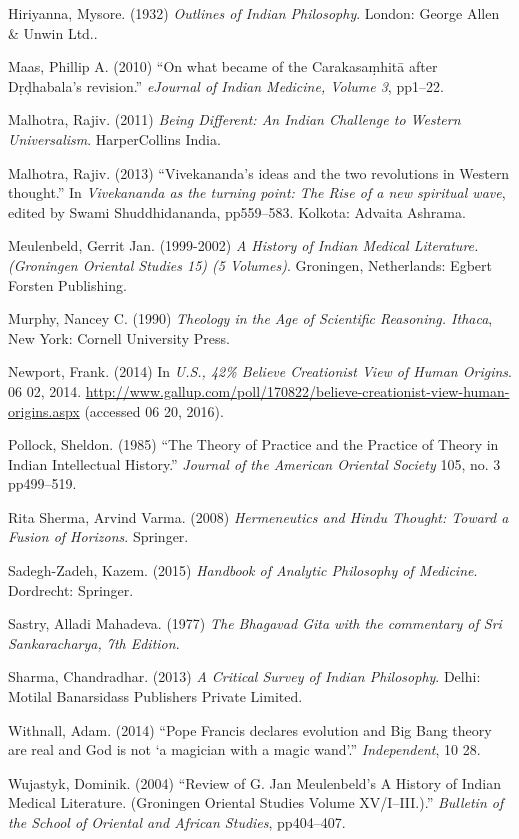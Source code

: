 \begin{thebibliography}{99}
Hiriyanna, Mysore. (1932) {\sl Outlines of Indian Philosophy}. London: George Allen \& Unwin Ltd..

Maas, Phillip A. (2010) ``On what became of the Carakasaṃhitā after Dṛḍhabala's revision.'' {\sl eJournal of Indian Medicine, Volume 3}, pp1--22.

Malhotra, Rajiv. (2011) {\sl Being Different: An Indian Challenge to Western Universalism}. HarperCollins India.

Malhotra, Rajiv. (2013) ``Vivekananda's ideas and the two revolutions in Western thought.'' In {\sl Vivekananda as the turning point: The Rise of a new spiritual wave}, edited by Swami Shuddhidananda, pp559--583. Kolkota: Advaita Ashrama.

Meulenbeld, Gerrit Jan. (1999-2002) {\sl A History of Indian Medical Literature. (Groningen Oriental Studies 15) (5 Volumes)}. Groningen, Netherlands: Egbert Forsten Publishing.

Murphy, Nancey C. (1990) {\sl Theology in the Age of Scientific Reasoning. Ithaca}, New York: Cornell University Press.

Newport, Frank. (2014) In {\sl U.S., 42\% Believe Creationist View of Human Origins}. 06 02, 2014. \url{http://www.gallup.com/poll/170822/believe-creationist-view-human-origins.aspx} (accessed 06 20, 2016).

Pollock, Sheldon. (1985) ``The Theory of Practice and the Practice of Theory in Indian Intellectual History.'' {\sl Journal of the American Oriental Society} 105, no. 3 pp499--519.

Rita Sherma, Arvind Varma. (2008) {\sl Hermeneutics and Hindu Thought: Toward a Fusion of Horizons}. Springer.

Sadegh-Zadeh, Kazem. (2015) {\sl Handbook of Analytic Philosophy of Medicine}. Dordrecht: Springer.

Sastry, Alladi Mahadeva. (1977) {\sl The Bhagavad Gita with the commentary of Sri Sankaracharya, 7th Edition}.

Sharma, Chandradhar. (2013) {\sl A Critical Survey of Indian Philosophy}. Delhi: Motilal Banarsidass Publishers Private Limited.

Withnall, Adam. (2014) ``Pope Francis declares evolution and Big Bang theory are real and God is not `a magician with a magic wand'.'' {\sl Independent}, 10 28.

Wujastyk, Dominik. (2004) ``Review of G. Jan Meulenbeld's A History of Indian Medical Literature. (Groningen Oriental Studies Volume XV/I--III.).'' {\sl Bulletin of the School of Oriental and African Studies}, pp404--407.
\end{thebibliography}

\theendnotes

